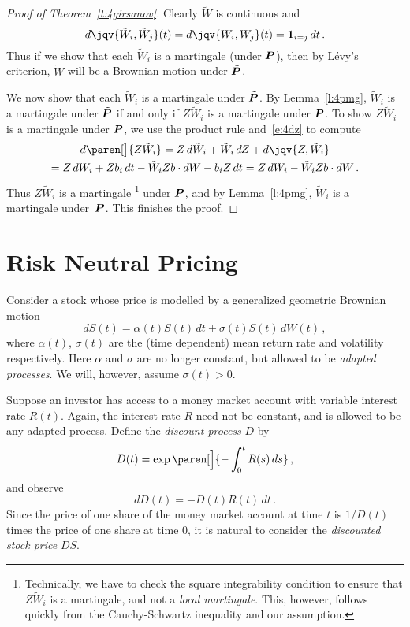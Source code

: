 \begin{proof}[Proof of Theorem~\ref{t:4girsanov}]
  Clearly $\tilde W$ is continuous and
  \begin{equation*}
    d\jqv{\tilde W_i, \tilde W_j}(t) 
      = d\jqv{W_i, W_j}(t)
      = \one_{i = j} \, dt\,.
  \end{equation*}
  Thus if we show that each $\tilde W_i$ is a martingale (under $\tilde \P$), then by L\'evy's criterion, $\tilde W$ will be a Brownian motion under $\tilde\P$.

  We now show that each $\tilde W_i$ is a martingale under $\tilde\P$.
  By Lemma~\ref{l:4pmg}, $\tilde W_i$ is a martingale under $\tilde\P$ if and only if $Z \tilde W_i$ is a martingale under $\P$.
  To show $Z \tilde W_i$ is a martingale under $\P$, we use the product rule and~\eqref{e:4dz} to compute
  \begin{multline*}
    d \paren[\big]{ Z \tilde W_i }
      = Z \, d\tilde W_i  + \tilde W_i \, dZ + d\jqv{Z, \tilde W_i}
  \\
      = Z \, dW_i  + Z b_i \, dt  - \tilde W_i Z b \cdot dW - b_i Z \, dt
      = Z \, dW_i - \tilde W_i Z b \cdot dW \,.
  \end{multline*}
  Thus $Z \tilde W_i$ is a martingale%
  \footnote{%
    Technically, we have to check the square integrability condition to ensure that $Z \tilde W_i$ is a martingale, and not a \emph{local martingale}.
    This, however, follows quickly from the Cauchy-Schwartz inequality and our assumption.
  }
  under $\P$, and by Lemma~\ref{l:4pmg}, $\tilde W_i$ is a martingale under~$\tilde\P$.
  This finishes the proof.
\end{proof}


\section{Risk Neutral Pricing}

Consider a stock whose price is modelled by a generalized geometric Brownian motion
\begin{equation*}
  dS(t) = \alpha(t) S(t) \, dt + \sigma(t) S(t) \, dW(t)\,,
\end{equation*}
where $\alpha(t)$, $\sigma(t)$ are the (time dependent) mean return rate and volatility respectively.
Here $\alpha$ and $\sigma$ are no longer constant, but allowed to be \emph{adapted processes}.
We will, however, assume $\sigma(t) > 0$.

Suppose an investor has access to a money market account with variable interest rate $R(t)$.
Again, the interest rate $R$ need not be constant, and is allowed to be any adapted process.
Define the \emph{discount process} $D$ by
\begin{equation*}
  D(t) = \exp\paren[\Big]{ - \int_0^t R(s) \, ds }\,,
\end{equation*}
and observe
\begin{equation*}
  dD(t) = -D(t) R(t) \, dt\,.
\end{equation*}
Since the price of one share of the money market account at time $t$ is $1/D(t)$ times the price of one share at time $0$, it is natural to consider the \emph{discounted stock price} $D S$.

